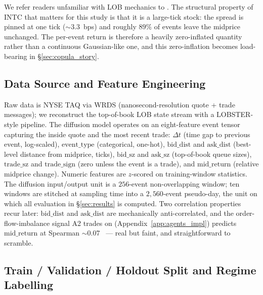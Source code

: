 \documentclass[journal]{IEEEtran}
\theoremstyle{definition}   %
\begin{document}
We refer readers unfamiliar with LOB mechanics to
\cite{gould2013limit}. The structural property of INTC that
matters for this study is that it is a large-tick stock: the
spread is pinned at one tick ($\sim$3.3~bps) and roughly $89\%$ of
events leave the midprice unchanged. The per-event return is
therefore a heavily zero-inflated quantity rather than a
continuous Gaussian-like one, and this zero-inflation becomes
load-bearing in \S\ref{sec:copula_story}.

\subsection{Data Source and Feature Engineering}
\label{sec:data_source}

Raw data is NYSE TAQ via WRDS (nanosecond-resolution quote + trade
messages); we reconstruct the top-of-book LOB state stream with a
LOBSTER-style pipeline. The diffusion model operates on an
eight-feature event tensor capturing the inside quote and the most
recent trade: $\Delta t$ (time gap to previous event, log-scaled),
$\text{event\_type}$ (categorical, one-hot), $\text{bid\_dist}$
and $\text{ask\_dist}$ (best-level distance from midprice, ticks),
$\text{bid\_sz}$ and $\text{ask\_sz}$ (top-of-book queue sizes),
$\text{trade\_sz}$ and $\text{trade\_sign}$ (zero unless the event
is a trade), and $\text{mid\_return}$ (relative midprice change).
Numeric features are $z$-scored on training-window statistics. The
diffusion input/output unit is a $256$-event non-overlapping
window; ten windows are stitched at sampling time into a
$2{,}560$-event pseudo-day, the unit on which all evaluation in
\S\ref{sec:results} is computed. Two correlation properties recur
later: $\text{bid\_dist}$ and $\text{ask\_dist}$ are mechanically
anti-correlated, and the order-flow-imbalance signal A2 trades on
(Appendix~\ref{app:agents_impl}) predicts $\text{mid\_return}$ at
Spearman $\sim$0.07~\cite{cont2014price} --- real but faint, and
straightforward to scramble.

\subsection{Train / Validation / Holdout Split and Regime Labelling}
\label{sec:splits}
\end{document}
